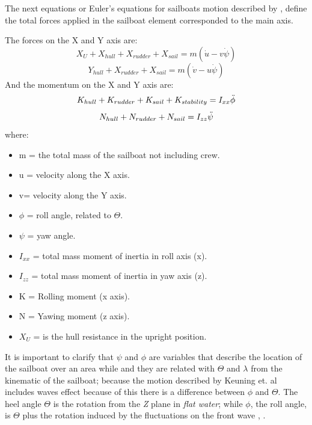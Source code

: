 The next equations or Euler's equations for sailboats motion described by \cite{keuning2004mathematical}, define the total forces applied in the sailboat element corresponded to the main axis.\par 
The forces on the X and Y axis are: \\  
\begin{equation}\label{eq:force_X_motion}
    X_{U}+X_{hull}+X_{rudder}+X_{sail}=m(\Dot{u}-v\Dot{\psi})
\end{equation}
\begin{equation}\label{eq:force_Y_motion}
    Y_{hull}+X_{rudder}+X_{sail}=m(\Dot{v}-u\Dot{\psi})
\end{equation}
And the momentum on the X and Y axis are: \\
\begin{equation}\label{eq:moment_X_motion}
    K_{hull}+K_{rudder}+K_{sail}+K_{stability}=I_{xx} \Ddot{\phi}
\end{equation}
\begin{equation}\label{eq:moment_Y_motion}
    N_{hull}+N_{rudder}+N_{sail}=I_{zz} \Ddot{\psi}
\end{equation}
where: 
\begin{itemize}  \label{symbols o motions}
 \setlength \itemsep{0em}
\item m = the total mass of the sailboat not including crew.
\item u = velocity along the X axis.
\item v= velocity along the Y axis.
\item $\phi$ = roll angle, related to $\Theta$.
\item $\psi$ = yaw angle. %
\item $I_{xx}$ = total mass moment of inertia in roll axis (x).
\item $I_{zz}$ = total mass moment of inertia in yaw axis (z).
\item K = Rolling moment (x axis).
\item N = Yawing moment (z axis).
\item $X_{U}$ = is the hull resistance in the upright position.
\end{itemize}
It is important to clarify that $\psi$ and $\phi$ are variables that describe the location of the sailboat over an area while and they are related with $\Theta$ and $\lambda$ from the kinematic of the sailboat; because the motion described by Keuning et. al \cite{keuning2004mathematical} includes waves effect because of this there is a difference between $\phi$ and $\Theta$. The heel angle $\Theta$ is the rotation from the \textit{Z} plane in \textit{flat water}; while $\phi$, the roll angle, is $\Theta$ plus the rotation induced by the fluctuations on the front wave \cite{kimball2009physics}, \cite{denny2009float}. \par 

